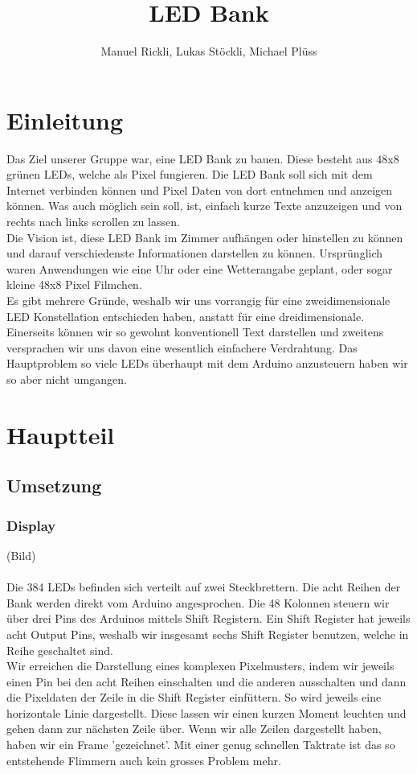 \documentclass[10pt,a4paper]{article}
\author{Manuel Rickli, Lukas Stöckli, Michael Plüss}
\title{LED Bank}
\begin{document}
\maketitle

\section{Einleitung}

Das Ziel unserer Gruppe war, eine LED Bank zu bauen. Diese besteht aus 48x8 grünen LEDs, welche als Pixel fungieren. Die LED Bank soll sich mit dem Internet verbinden können und Pixel Daten von dort entnehmen und anzeigen können. Was auch möglich sein soll, ist, einfach kurze Texte anzuzeigen und von rechts nach links scrollen zu lassen.\\
Die Vision ist, diese LED Bank im Zimmer aufhängen oder hinstellen zu können und darauf verschiedenste Informationen darstellen zu können. Ursprünglich waren Anwendungen wie eine Uhr oder eine Wetterangabe geplant, oder sogar kleine 48x8 Pixel Filmchen.\\
Es gibt mehrere Gründe, weshalb wir uns vorrangig für eine zweidimensionale LED Konstellation entschieden haben, anstatt für eine dreidimensionale. Einerseits können wir so gewohnt konventionell Text darstellen und zweitens versprachen wir uns davon eine wesentlich einfachere Verdrahtung. Das Hauptproblem so viele LEDs überhaupt mit dem Arduino anzusteuern haben wir so aber nicht umgangen.\\

\section{Hauptteil}

\subsection{Umsetzung}

\subsubsection{Display}

(Bild)\\\\

Die 384 LEDs befinden sich verteilt auf zwei Steckbrettern. Die acht Reihen der Bank werden direkt vom Arduino angesprochen. Die 48 Kolonnen steuern wir über drei Pins des Arduinos mittels Shift Registern. Ein Shift Register hat jeweils acht Output Pins, weshalb wir insgesamt sechs Shift Register benutzen, welche in Reihe geschaltet sind.\\
Wir erreichen die Darstellung eines komplexen Pixelmusters, indem wir jeweils einen Pin bei den acht Reihen einschalten und die anderen ausschalten und dann die Pixeldaten der Zeile in die Shift Register einfüttern. So wird jeweils eine horizontale Linie dargestellt. Diese lassen wir einen kurzen Moment leuchten und gehen dann zur nächsten Zeile über. Wenn wir alle Zeilen dargestellt haben, haben wir ein Frame 'gezeichnet'. Mit einer genug schnellen Taktrate ist das so entstehende Flimmern auch kein grosses Problem mehr.\\
\end{document}
